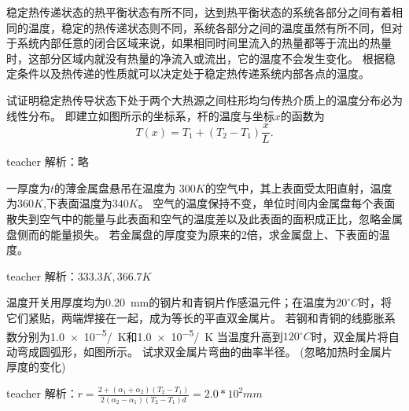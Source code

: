 稳定热传递状态的热平衡状态有所不同，达到热平衡状态的系统各部分之间有着相同的温度，稳定的热传递状态则不同，系统各部分之间的温度虽然有所不同，但对于系统内部任意的闭合区域来说，如果相同时间里流入的热量都等于流出的热量时，这部分区域内就没有热量的净流入或流出，它的温度不会发生变化。
根据稳定条件以及热传递的性质就可以决定处于稳定热传递系统内部各点的温度。
\begin{example}
试证明稳定热传导状态下处于两个大热源之间柱形均匀传热介质上的温度分布必为线性分布。
即建立如图所示的坐标系，杆的温度与坐标$x$的函数为\[T(x)=T_1+(T_2-T_1)\frac{x}{L}.\]
\begin{taggedblock}{teacher}
\newline
解析：略
\end{taggedblock}
\end{example}







\begin{example}
一厚度为$t$的薄金属盘悬吊在温度为 $300\unit{K}$的空气中，其上表面受太阳直射，温度为$360\unit{K}$,下表面温度为$340\unit{K}$。
空气的温度保持不变，单位时间内金属盘每个表面散失到空气中的能量与此表面和空气的温度差以及此表面的面积成正比，忽略金属盘侧而的能量损失。
若金属盘的厚度变为原来的2倍，求金属盘上、下表面的温度。
\begin{taggedblock}{teacher}
\newline
解析：$333.3\si{K},366.7\si{K}$
\end{taggedblock}
\end{example}

\begin{example}
	温度开关用厚度均为0.20~\si{mm}的钢片和青铜片作感温元件；在温度为$20^\circ C$时，将它们紧贴，两端焊接在一起，成为等长的平直双金属片。
	若钢和青铜的线膨胀系数分别为\num{1.0e-5}\si{/K}和\num{1.0e-5}\si{/K}
	当温度升高到$120^\circ C$时，双金属片将自动弯成圆弧形，如图所示。
	试求双金属片弯曲的曲率半径。 (忽略加热时金属片厚度的变化)
	\begin{taggedblock}{teacher}
		\newline
		解析：$r=\frac{2+(\alpha_1+\alpha_2)(T_2-T_1)}{2(\alpha_2-\alpha_1)(T_2-T_1)d}=2.0*10^2\si{mm}$
	\end{taggedblock}
\end{example}

